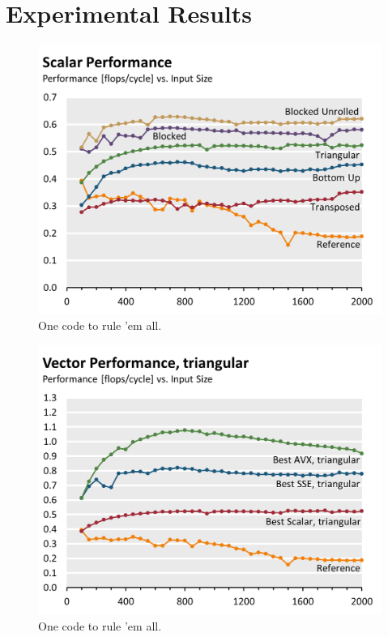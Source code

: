 \section{Experimental Results}


\begin{figure}\centering
  \includegraphics[width=\linewidth]{plot_data/scalar_performance.png}
  \caption{One code to rule 'em all.}
  \label{fig:perf-scalar}
\end{figure}
\begin{figure}\centering
  \includegraphics[width=\linewidth]{plot_data/triangular_vector_performance.png}
  \caption{One code to rule 'em all.}
  \label{fig:perf-triangular}
\end{figure}
